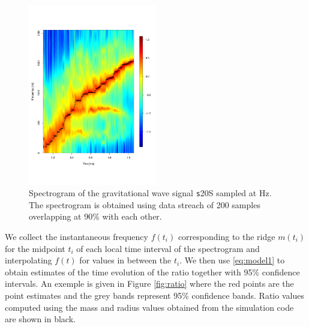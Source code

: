 \begin{figure}
 \centering
 \includegraphics[width=0.5\textwidth]{plots/spectrogram}
 \caption{Spectrogram of the gravitational wave signal {\texttt s20S} sampled at \unit[4096]{Hz}.
   The spectrogram is obtained using data streach of 200 samples overlapping at 90\%
   with each other.} \label{fig:spectrogram}
\end{figure}


We collect the instantaneous frequency $f(t_i)$ corresponding to the ridge $m(t_i)$ for
the midpoint $t_i$ of each local time interval of the spectrogram and interpolating $f(t)$
for values in between the $t_i$. We then use 
\eqref{eq:model1} to obtain
estimates of the time evolution of the ratio together with 95\% confidence intervals.
An exemple is given in Figure \ref{fig:ratio} where the red points are the point estimates and
the grey bands represent 95\% confidence bands. Ratio values
computed using the mass and radius values obtained from the simulation code  are shown in black.

